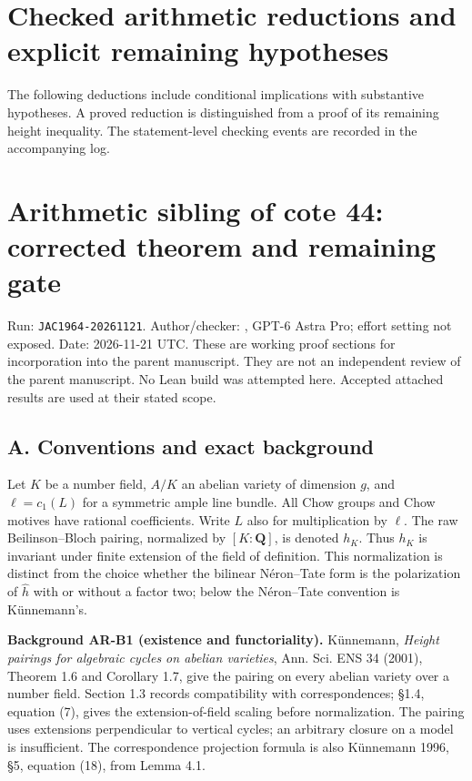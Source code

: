 \documentclass[11pt,a4paper]{article}
\begin{document}
\section{Checked arithmetic reductions and explicit remaining hypotheses}
The following deductions include conditional implications with substantive
hypotheses. A proved reduction is distinguished from a proof of its
remaining height inequality. The statement-level checking events are
recorded in the accompanying log.
\section{Arithmetic sibling of cote 44: corrected theorem and remaining
gate}\label{arithmetic-sibling-of-cote-44-corrected-theorem-and-remaining-gate}

Run: \texttt{JAC1964-20261121}. Author/checker:
, GPT-6 Astra Pro; effort setting not
exposed. Date: 2026-11-21 UTC. These are working proof sections for
incorporation into the parent manuscript. They are not an independent
review of the parent manuscript. No Lean build was attempted here.
Accepted attached results are used at their stated scope.

\subsection{A. Conventions and exact
background}\label{a.-conventions-and-exact-background}

Let \(K\) be a number field, \(A/K\) an abelian variety of dimension
\(g\), and \(\ell=c_1(L)\) for a symmetric ample line bundle. All Chow
groups and Chow motives have rational coefficients. Write \(L\) also for
multiplication by \(\ell\). The raw Beilinson--Bloch pairing, normalized
by \([K:\mathbf Q]\), is denoted \(h_K\). Thus \(h_K\) is invariant
under finite extension of the field of definition. This normalization is
distinct from the choice whether the bilinear Néron--Tate form is the
polarization of \(\widehat h\) with or without a factor two; below the
Néron--Tate convention is Künnemann's.

\textbf{Background AR-B1 (existence and functoriality).} Künnemann,
\emph{Height pairings for algebraic cycles on abelian varieties}, Ann.
Sci. ENS 34 (2001), Theorem 1.6 and Corollary 1.7, give the pairing on
every abelian variety over a number field. Section 1.3 records
compatibility with correspondences; §1.4, equation (7), gives the
extension-of-field scaling before normalization. The pairing uses
extensions perpendicular to vertical cycles; an arbitrary closure on a
model is insufficient. The correspondence projection formula is also
Künnemann 1996, §5, equation (18), from Lemma 4.1.
\end{document}
